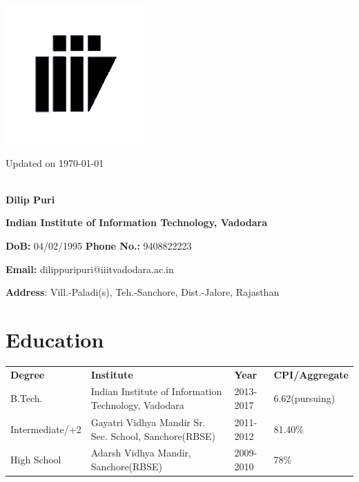 \documentclass{article}
\begin{document}
\begin{minipage}{.1\textwidth}
\includegraphics[scale=0.6]{logo_iiitv.png}
\end{minipage}%
\begin{minipage}{1.5\textwidth}
\hspace*{13cm}Updated on \today \\ \\
\begin{large}
\hspace*{4cm}\textbf{Dilip Puri}\vspace*{2mm}

\hspace*{4cm}\textbf{Indian Institute of Information Technology, Vadodara}\vspace*{2mm}

\hspace*{4cm}\textbf{DoB:} 04/02/1995 \textbf{Phone No.:} 9408822223\vspace*{2mm}

\hspace*{4cm}\textbf{Email:} dilippuripuri@iiitvadodara.ac.in\vspace*{2mm}

\hspace*{4cm}\textbf{Address}: Vill.-Paladi(s), Teh.-Sanchore, Dist.-Jalore, Rajasthan
\end{large}    
\end{minipage}

\section{Education}
\vspace*{2mm}
\begin{tabular}{llll}
\textbf{Degree}&\textbf{Institute}&\textbf{Year}&\textbf{CPI/Aggregate}\vspace*{1mm} \\
B.Tech.& Indian Institute of Information Technology, Vadodara & 2013-2017 & 6.62(pursuing)\\
Intermediate/+2 & Gayatri Vidhya Mandir Sr. Sec. School, Sanchore(RBSE) & 2011-2012 & 81.40\%\\
High School & Adarsh Vidhya Mandir, Sanchore(RBSE) & 2009-2010 & 78\%\\
\end{tabular}
\end{document}
